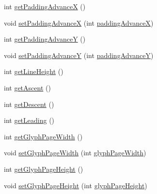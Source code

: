 \begin{DoxyCompactItemize}
\item 
int \mbox{\hyperlink{classorg_1_1newdawn_1_1slick_1_1_unicode_font_a51f2a48ec3062648508078779ff36856}{get\+Padding\+AdvanceX}} ()
\item 
void \mbox{\hyperlink{classorg_1_1newdawn_1_1slick_1_1_unicode_font_a90716509cbd8266db885d4068b7129fe}{set\+Padding\+AdvanceX}} (int \mbox{\hyperlink{classorg_1_1newdawn_1_1slick_1_1_unicode_font_a347a5d8b2baa6ab7f037d5f869504883}{padding\+AdvanceX}})
\item 
int \mbox{\hyperlink{classorg_1_1newdawn_1_1slick_1_1_unicode_font_a352039fb85e36e9660d3b6aae03641eb}{get\+Padding\+AdvanceY}} ()
\item 
void \mbox{\hyperlink{classorg_1_1newdawn_1_1slick_1_1_unicode_font_ad10b4bc614f7e2b66e650726918940b2}{set\+Padding\+AdvanceY}} (int \mbox{\hyperlink{classorg_1_1newdawn_1_1slick_1_1_unicode_font_ac04c92b5304822a4187a2e7184f4aca8}{padding\+AdvanceY}})
\item 
int \mbox{\hyperlink{classorg_1_1newdawn_1_1slick_1_1_unicode_font_a4f245d11a64ccc71aa9b1d48d89cbc09}{get\+Line\+Height}} ()
\item 
int \mbox{\hyperlink{classorg_1_1newdawn_1_1slick_1_1_unicode_font_a72ed12d1f5f60d5352f1f1bcdbd6df28}{get\+Ascent}} ()
\item 
int \mbox{\hyperlink{classorg_1_1newdawn_1_1slick_1_1_unicode_font_aab331e8ccf25173d5e386f18fbca6a30}{get\+Descent}} ()
\item 
int \mbox{\hyperlink{classorg_1_1newdawn_1_1slick_1_1_unicode_font_a6b413725e820d98254b8c6b8af68976e}{get\+Leading}} ()
\item 
int \mbox{\hyperlink{classorg_1_1newdawn_1_1slick_1_1_unicode_font_a1a033ce1ceec45ced33842cdf6e25670}{get\+Glyph\+Page\+Width}} ()
\item 
void \mbox{\hyperlink{classorg_1_1newdawn_1_1slick_1_1_unicode_font_a83fbec1e5c863d4b3fbe77d9e9df740f}{set\+Glyph\+Page\+Width}} (int \mbox{\hyperlink{classorg_1_1newdawn_1_1slick_1_1_unicode_font_a3fe610a3c34ca1aa69a118601e8cb2bc}{glyph\+Page\+Width}})
\item 
int \mbox{\hyperlink{classorg_1_1newdawn_1_1slick_1_1_unicode_font_ad84a713b212682b5e7981c72b63d8703}{get\+Glyph\+Page\+Height}} ()
\item 
void \mbox{\hyperlink{classorg_1_1newdawn_1_1slick_1_1_unicode_font_aae86b4ba382762f890288ca53127074e}{set\+Glyph\+Page\+Height}} (int \mbox{\hyperlink{classorg_1_1newdawn_1_1slick_1_1_unicode_font_ac919dac32be8c1baf29a21625e0719b9}{glyph\+Page\+Height}})
\item 

\end{DoxyCompactItemize}
